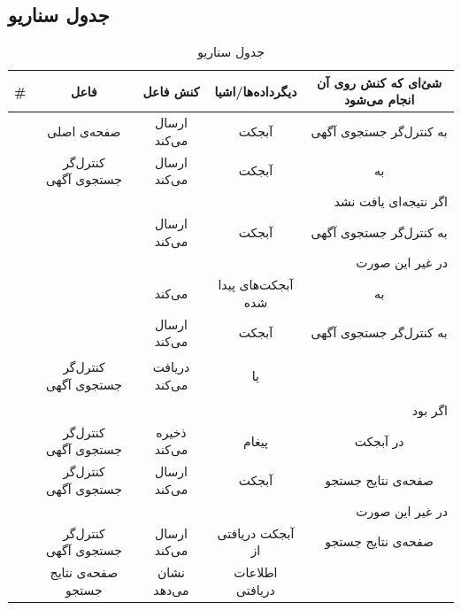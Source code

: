 \subsection{جدول سناریو}
\begin{table}[H]
	\caption{جدول سناریو }
	\begin{adjustbox}{width=\textwidth}
		\begin{tabular}{|c|c|c|c|c|}
			\hline								
			\# & فاعل & کنش فاعل & دیگرداده‌ها/اشیا & شئ‌ای که کنش روی آن انجام می‌شود \\
			\hline
			\hline
			\sstep &
			صفحه‌ی اصلی &
			ارسال می‌کند &
			آبجکت \json &
			به کنترل‌گر جستجوی آگهی \\
			\hline
			\sstep &
			کنترل‌گر جستجوی آگهی&
			ارسال می‌کند &
			آبجکت \json &
			به \gdm\\
			\hline
			\sstep &
			\multicolumn{4}{|r|}{اگر نتیجه‌ای یافت نشد}\\
			\hline
			\sstep &
			\gdm&
			ارسال می‌کند &
			آبجکت \none&
			به کنترل‌گر جستجوی آگهی \\
			\hline
			\sstep &
			\multicolumn{4}{|r|}{در غیر این صورت}\\
			\hline
			\sstep &
			\gdm&
			\serialize می‌کند&
			آبجکت‌های پیدا شده &
			به \json \\
			\hline
			\sstep &
			\gdm &
			ارسال ‌می‌کند&
			آبجکت \json &
			به کنترل‌‌گر جستجوی آگهی \\
			\hline
			\sstep &
			کنترل‌‌گر جستجوی آگهی&
			دریافت می‌کند &
			\begin{inparaitem}
				\item \none 
			\end{inparaitem}
			یا 
			\begin{inparaitem}
				\item \json
			\end{inparaitem}
			&
			\\
			\hline
			\sstep &
			\multicolumn{4}{|r|}{اگر \none بود}
			\\
			\hline
			\sstep &
			کنترل‌گر جستجوی آگهی &
			ذخیره می‌کند &
			پیغام \say{آگهی‌ای پیدا نشد}&
			در آبجکت \json \\
			\hline
			\sstep &
			کنترل‌گر جستجوی آگهی &
			ارسال می‌کند &
			آبجکت \json &
			صفحه‌ی نتایج جستجو\\
			\hline
			\sstep &
			\multicolumn{4}{|r|}{در غیر این صورت}
			\\
			\hline
			\sstep &
			کنترل‌گر جستجوی آگهی&
			ارسال می‌کند &
			آبجکت \json دریافتی از \gdm&
			صفحه‌ی نتایج جستجو\\
			\hline
			\sstep & 
			صفحه‌ی نتایج جستجو &
			نشان می‌دهد & 
			 اطلاعات دریافتی & 
			 \\
			 \hline
		\end{tabular}
	\end{adjustbox}
\end{table}
\setcounter{MainStepCounter}{0}
\setcounter{SenarioCounter}{0}

